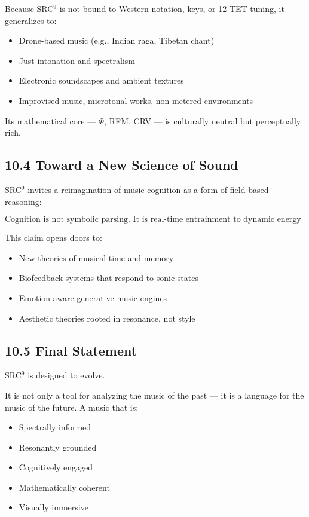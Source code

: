 \documentclass[10pt]{article}
\begin{document}
Because SRC$^{9}$ is not bound to Western notation, keys, or 12-TET tuning, it generalizes to:

\begin{itemize}
    \item Drone-based music (e.g., Indian raga, Tibetan chant)
    \item Just intonation and spectralism
    \item Electronic soundscapes and ambient textures
    \item Improvised music, microtonal works, non-metered environments
\end{itemize}

Its mathematical core — $\Phi$, RFM, CRV — is culturally neutral but perceptually rich.

\subsection*{10.4 Toward a New Science of Sound}

SRC$^{9}$ invites a reimagination of music cognition as a form of field-based reasoning:

\[
\text{Cognition is not symbolic parsing. It is real-time entrainment to dynamic energy structures.}
\]

This claim opens doors to:

\begin{itemize}
    \item New theories of musical time and memory
    \item Biofeedback systems that respond to sonic states
    \item Emotion-aware generative music engines
    \item Aesthetic theories rooted in resonance, not style
\end{itemize}

\subsection*{10.5 Final Statement}

SRC$^{9}$ is designed to evolve.

It is not only a tool for analyzing the music of the past — it is a language for the music of the future. A music that is:

\begin{itemize}
    \item Spectrally informed
    \item Resonantly grounded
    \item Cognitively engaged
    \item Mathematically coherent
    \item Visually immersive
\end{itemize}
\end{document}
